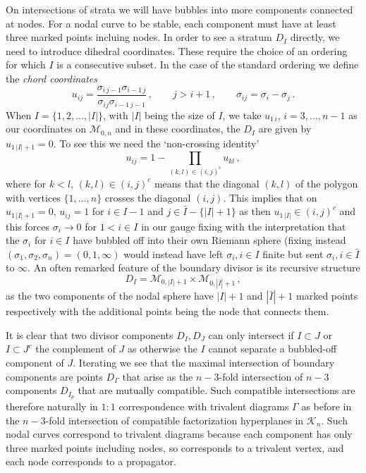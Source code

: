 \documentclass[11pt]{article}
\newcommand{\cK}{\mathcal{K}}
\newcommand{\cM}{\mathcal{M}}
\newcommand{\1}{{\rm 1\hskip-0.25em I}}
\begin{document}
On intersections of strata we will have bubbles into more components connected at nodes.  For a nodal curve to be stable, each component must have at least three marked points incluing nodes.   In order to see a stratum $D_I$ directly, we need to introduce dihedral coordinates. These require the choice of an ordering for which $I$ is a consecutive subset.  In the case of the standard ordering we define the \emph{chord coordinates}
\begin{equation}
u_{ij}=\frac{\sigma_{i\,j-1}\sigma_{i-1\, j}}{\sigma_{ij}\sigma_{i-1\, j-1}}\, , \qquad j>i+1\, ,\qquad \sigma_{ij}=\sigma_i-\sigma_j\, .
\end{equation}
When $I=\{1,2,\ldots ,|I|\}$, with $|I|$ being the size of $I$, we take  $u_{1\, i}$, $i=3,\ldots,n-1$ as our coordinates on  $\cM_{0,n}$ and in these coordinates, the $D_I$ are given by $u_{1\,|I|+1}=0$.  To see this we need the `non-crossing identity'
\begin{equation}
u_{ij}=1-\prod_{(k,l)\in (i,j)^c} u_{kl}\, , \label{non-cross}
\end{equation}
where for $k<l$, $(k,l)\in (i,j)^c$ means that the diagonal $(k,l)$ of the polygon with vertices $\{1,\ldots,n\}$ crosses the diagonal $(i,j)$.  This implies that on $u_{1\, |I|+1}=0$, $u_{ij}=1$ for $i\in I-1$ and $j\in \bar I-\{|I|+1\}$ as then $u_{1\,|I|}\in (i,j)^c$ and this forces $\sigma_{i}\rightarrow 0$ for $1<i\in I$ in our gauge fixing with the interpretation that the $\sigma_i$ for $i\in I$ have bubbled off into their own Riemann sphere (fixing instead $(\sigma_1,\sigma_2,\sigma_n)=(0,1,\infty)$ would instead have left $\sigma_i, i\in I$ finite but sent $\sigma_i, i\in \bar I$ to $\infty$.
An often remarked  feature of the boundary divisor is its recursive structure
\begin{equation}
 D_I=\cM_{0,|I|+1}\times \cM_{0,|\bar I|+1}\, ,
\end{equation}
as the two components of the nodal sphere have $|I|+1$ and $|\bar I|+1$ marked points respectively with the additional points being the node that connects them.   



It is clear that two divisor components $D_I, D_J$ can only intersect if $I\subset J$ or $I\subset J^c$ the complement of $J$ as otherwise the $I$ cannot separate a bubbled-off component of $J$.  Iterating we see that the maximal intersection of boundary components are points $D_\Gamma$ that arise as the $n-3$-fold intersection of $n-3$ components $D_{I_p}$ that are mutually compatible. Such compatible intersections are therefore naturally in $1:1$ correspondence with trivalent diagrams $\Gamma$ as before in the $n-3$-fold intersection of compatible factorization hyperplanes in $\cK_n$. Such nodal curves correspond to trivalent diagrams because each component has only three marked points including nodes, so corresponds to a trivalent vertex, and each node corresponds to a propagator.
\end{document}

